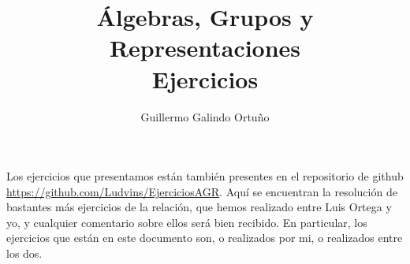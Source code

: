 \documentclass[UTF8]{article}
\begin{document}
\title{Álgebras, Grupos y Representaciones \\
      \large Ejercicios
  }

\author{Guillermo Galindo Ortuño}

\maketitle

Los ejercicios que presentamos están también presentes en el repositorio de github \url{https://github.com/Ludvins/EjerciciosAGR}. Aquí se encuentran la resolución de bastantes más ejercicios de la relación, que hemos realizado entre Luis Ortega y yo, y cualquier comentario sobre ellos será bien recibido. En particular, los ejercicios que están en este documento son, o realizados por mi, o realizados entre los dos.




\end{document}
